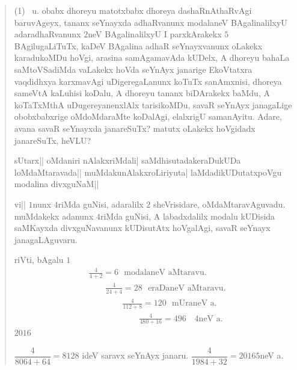 \begin{verse}
{\rm(1)}~ u. obabx dhoreyu matotxbabx dhoreya dashaRnAthaRvAgi
baruvAgeyx, tananx seYnayxda adhaRvanunx modalaneV BAgalinalilxyU
adaradhaRvanunx $2$neV BAgalinalilxyU I parxkArakekx $5$
BAgiluga\-LiTuTx, kaDeV BAgalina adhaR seYnayxvanunx oLakekx karadukoMDu
hoVgi, arasina samAgamavAda kUDelx, A dhoreyu bahaLa saMtoVSadiMda
vaLakekx hoVda seYnAyx janarige EkoVtatxra vaqdidhxya karxmavAgi
uDigeregaLanunx koTuTx sanAmxnisi, dhoreya sameVtA kaLuhisi koDalu, A
dhoreyu tananx biDArakekx baMdu, A koTaTxMthA uDugereyanenxlAlx
tarisikoMDu, savaR seYnAyx janagaLige obobxbabxrige oMdoMdaraMte
koDalAgi, elalxrigU samanAyitu. Adare, avana savaR seYnayxda
janareSuTx? matutx oLakekx hoVgidadx janareSuTx, heVLU?

sUtarx|| oMdaniri nAlakxriMdali| saMdhisutadakeraDukUDa
loMdaMtaravada|| muMdakunAlakxroLiriyuta| laMdadikUDutatxpoVgu
modalina divxguNaM||

vi|| $1$nunx $4$riMda guNisi, adaralilx $2$ sheVrisidare,
oMdaMtaravAguvadu. muMdakekx adanunx $4$riMda guNisi, A labadxdalilx
modalu kUDisida saMKayxda divxguNavanunx kUDisutAtx hoVgalAgi, savaR
seYnayx janagaLAguvaru.

riVti, bAgalu $1$
\begin{align*}
&\frac{4}{4+2}=6\text{~ modalaneV aMtaravu.}\\
&\qquad \frac{4}{24+4}=28\text{~ eraDaneV aMtaravu.}\\
&\qquad\qquad \frac{4}{112+8}=120\text{~ mUraneV a.}\\
&\qquad\qquad\qquad \frac{4}{480+16}=496\text{~~ $4$neV a.}
\end{align*}
$2016$

$\dfrac{4}{8064+64}=8128$ ideV saravx seYnAyx
janaru. $\dfrac{4}{1984+32}=2016$\quad $5$neV a.
\end{verse}

\bigskip

